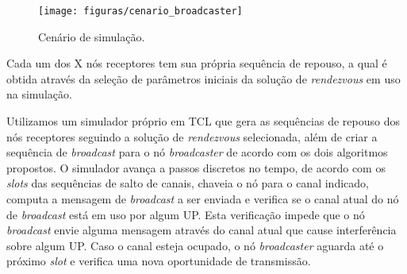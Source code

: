 \begin{figure}[!ht]
	\begin{center}
			\texttt{[image: figuras/cenario\_broadcaster]}
		\caption{Cenário de simulação.}
		\label{fig:cen_broadcaster}
	\end{center}
\end{figure}



Cada um dos X nós receptores tem sua própria sequência de repouso, a qual é obtida através da seleção de parâmetros iniciais da solução de {\it rendezvous} em uso na simulação.

Utilizamos um simulador próprio em TCL que gera as sequências de repouso dos nós receptores seguindo a solução de {\it rendezvous} selecionada, além de criar a sequência de {\it broadcast} para o nó {\it broadcaster} de acordo com os dois algoritmos propostos. O simulador avança a passos discretos no tempo, de acordo com os {\it slots} das sequências de salto de canais, chaveia o nó para o canal indicado, computa a mensagem de {\it broadcast} a ser enviada e verifica se o canal atual do nó de {\it broadcast} está em uso por algum UP. Esta verificação impede que o nó {\it broadcast} envie alguma mensagem através do canal atual que cause interferência sobre algum UP. Caso o canal esteja ocupado, o nó {\it broadcaster} aguarda até o próximo {\it slot} e verifica uma nova oportunidade de transmissão.  


 
